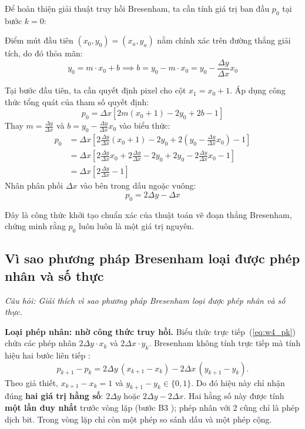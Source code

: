 Để hoàn thiện giải thuật truy hồi Bresenham, ta cần tính giá trị ban đầu $p_0$ tại bước $k = 0$:

Điểm mút đầu tiên $(x_0, y_0) = (x_a, y_a)$ nằm chính xác trên đường thẳng giải tích, do đó thỏa mãn:
\begin{equation}
y_0 = m \cdot x_0 + b \implies b = y_0 - m \cdot x_0 = y_0 - \frac{\Delta y}{\Delta x} x_0
\end{equation}

Tại bước đầu tiên, ta cần quyết định pixel cho cột $x_1 = x_0 + 1$. Áp dụng công thức tổng quát của tham số quyết định:
\begin{equation}
p_0 = \Delta x [2m(x_0 + 1) - 2y_0 + 2b - 1]
\end{equation}
Thay $m = \frac{\Delta y}{\Delta x}$ và $b = y_0 - \frac{\Delta y}{\Delta x} x_0$ vào biểu thức:
\begin{align}
p_0 &= \Delta x \left[ 2 \frac{\Delta y}{\Delta x}(x_0 + 1) - 2y_0 + 2\left(y_0 - \frac{\Delta y}{\Delta x} x_0\right) - 1 \right] \nonumber \\
&= \Delta x \left[ 2 \frac{\Delta y}{\Delta x} x_0 + 2 \frac{\Delta y}{\Delta x} - 2y_0 + 2y_0 - 2 \frac{\Delta y}{\Delta x} x_0 - 1 \right] \nonumber \\
&= \Delta x \left[ 2 \frac{\Delta y}{\Delta x} - 1 \right]
\end{align}
Nhân phân phối $\Delta x$ vào bên trong dấu ngoặc vuông:
\begin{equation}
p_0 = 2\Delta y - \Delta x \label{eq:w4_p0}
\end{equation}

Đây là công thức khởi tạo chuẩn xác của thuật toán vẽ đoạn thẳng Bresenham, chứng minh rằng $p_0$ luôn luôn là một giá trị nguyên.

\subsection{Vì sao phương pháp Bresenham loại được phép nhân và số thực}
\label{subsec:w4_bres_int}

\textit{Câu hỏi: Giải thích vì sao phương pháp Bresenham loại được phép nhân và số thực.}

\textbf{Loại phép nhân: nhờ công thức truy hồi.} Biểu thức trực tiếp~(\ref{eq:w4_pk}) chứa các phép nhân $2\Delta y \cdot x_k$ và $2\Delta x \cdot y_k$. Bresenham không tính trực tiếp mà tính hiệu hai bước liên tiếp \citep[slide~8]{dhmt_lec3}:
\begin{equation}
p_{k+1} - p_k = 2\Delta y\,(x_{k+1} - x_k) - 2\Delta x\,(y_{k+1} - y_k).
\end{equation}
Theo giả thiết, $x_{k+1} - x_k = 1$ và $y_{k+1} - y_k \in \{0, 1\}$. Do đó hiệu này chỉ nhận đúng \textbf{hai giá trị hằng số}: $2\Delta y$ hoặc $2\Delta y - 2\Delta x$. Hai hằng số này được tính \textbf{một lần duy nhất} trước vòng lặp (bước B3 \citep[slide~11]{dhmt_lec3}); phép nhân với $2$ cũng chỉ là phép dịch bit. Trong vòng lặp chỉ còn một phép so sánh dấu và một phép cộng.

